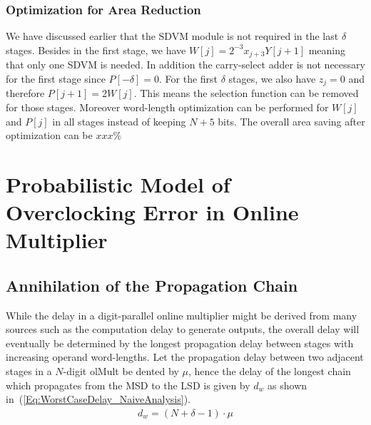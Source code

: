 \documentclass[a4paper, 11pt]{article}
\begin{document}
\subsubsection{Optimization for Area Reduction}
We have discussed earlier that the SDVM module is not required in the last $\delta$ stages. Besides in the first stage, we have $W[j] = 2^{-3}x_{j+3}Y[j+1]$ meaning that only one SDVM is needed. In addition the carry-select adder is not necessary for the first stage since $P[-\delta]=0$. For the first $\delta$ stages, we also have $z_j=0$ and therefore $P[j+1]=2W[j]$. This means the selection function can be removed for those stages. Moreover word-length optimization can be performed for $W[j]$ and $P[j]$ in all stages instead of keeping $N+5$ bits. The overall area saving after optimization can be $xxx\%$



\section{Probabilistic Model of Overclocking Error in Online Multiplier}
\subsection{Annihilation of the Propagation Chain}\label{subSec:AnnihilationOfChain}

While the delay in a digit-parallel online multiplier might be derived from many sources such as the computation delay to generate outputs, the overall delay will eventually be determined by the longest propagation delay between stages with increasing operand word-lengths. Let the propagation delay between two adjacent stages in a $N$-digit olMult be dented by $\mu$, hence the delay of the longest chain which propagates from the MSD to the LSD is given by $d_w$ as shown in~(\ref{Eq:WorstCaseDelay_NaiveAnalysis}).
\begin{eqnarray}\label{Eq:WorstCaseDelay_NaiveAnalysis}
  d_w = (N+\delta-1)\cdot \mu
\end{eqnarray}
\end{document}
